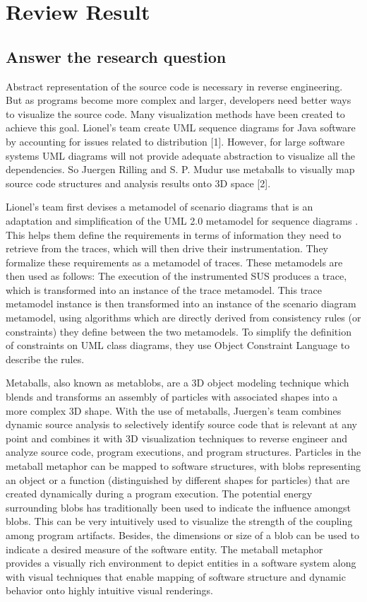 \documentclass{article}
\begin{document}
\section{Review Result}



\subsection{Answer the research question}

Abstract representation of the source code is necessary in reverse engineering. But as programs become more complex and larger, developers need better ways to visualize the source code. Many visualization methods have been created to achieve this goal. Lionel's team create UML sequence diagrams for Java software by accounting for issues related to distribution [1]. However, for large software systems UML diagrams will not provide adequate abstraction to visualize all the dependencies. So Juergen Rilling and S. P. Mudur use metaballs to visually map source code structures and analysis results onto 3D space [2].

Lionel's team first devises a metamodel of scenario diagrams that is an adaptation and simplification of the UML 2.0 metamodel for sequence diagrams . This helps them define the requirements in terms of information they need to retrieve from the traces, which will then drive their instrumentation. They formalize these requirements as a metamodel of traces. These metamodels are then used as follows: The execution of the instrumented SUS produces a trace, which is transformed into an instance of the trace metamodel. This trace metamodel instance is then transformed into an instance of the scenario diagram metamodel, using algorithms which are directly derived from consistency rules (or constraints) they define between the two metamodels. To simplify the definition of constraints on UML class diagrams, they use Object Constraint Language to describe the rules.

Metaballs, also known as metablobs, are a 3D object modeling technique which blends and transforms an assembly of particles with associated shapes into a more complex 3D shape. With the use of metaballs,  Juergen's team combines dynamic source analysis to selectively identify source code that is relevant at any point and combines it with 3D visualization techniques to reverse engineer and analyze source code, program executions, and program structures. Particles in the metaball metaphor can be mapped to software structures, with blobs representing an object or a function (distinguished by different shapes for particles) that are created dynamically during a program execution. The potential energy surrounding blobs has traditionally been used to indicate the influence amongst blobs. This can be very intuitively used to visualize the strength of the coupling among program artifacts. Besides, the dimensions or size of a blob can be used to indicate a desired measure of the software entity. The metaball metaphor provides a visually rich environment to depict entities in a software system along with visual techniques that enable mapping of software structure and dynamic behavior onto highly intuitive visual renderings. 
\end{document}
